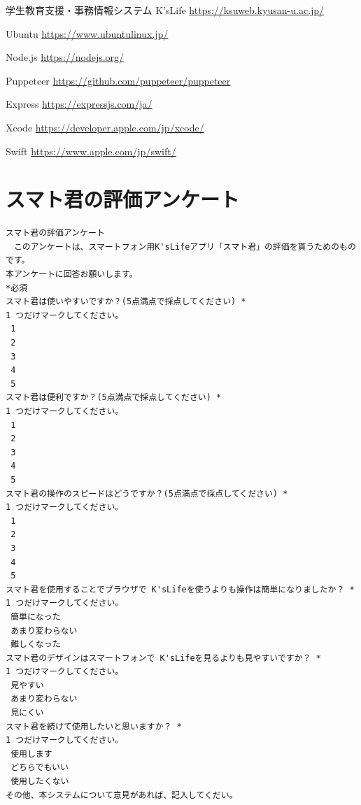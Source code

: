 \documentclass[a4j,12pt,onecolumn,oneside,titlepage,openany,final]{jreport}
\begin{document}
\begin{thebibliography}{99}%
学生教育支援・事務情報システム K'sLife \url{https://ksuweb.kyusan-u.ac.jp/}


   Ubuntu
  \url{https://www.ubuntulinux.jp/}

   Node.js
  \url{https://nodejs.org/}

   Puppeteer
  \url{https://github.com/puppeteer/puppeteer}

   Express
  \url{https://expressjs.com/ja/}

   Xcode
  \url{https://developer.apple.com/jp/xcode/}

   Swift
  \url{https://www.apple.com/jp/swift/}


\end{thebibliography}
\appendix
\chapter{スマト君の評価アンケート}\label{hyouka}
\begin{verbatim}
スマト君の評価アンケート
　このアンケートは、スマートフォン用K'sLifeアプリ「スマト君」の評価を貰うためのものです。
本アンケートに回答お願いします。
*必須
スマト君は使いやすいですか？(5点満点で採点してください) *
1 つだけマークしてください。
 1
 2
 3
 4
 5
スマト君は便利ですか？(5点満点で採点してください) *
1 つだけマークしてください。
 1
 2
 3
 4
 5
スマト君の操作のスピードはどうですか？(5点満点で採点してください) *
1 つだけマークしてください。
 1
 2
 3
 4
 5
スマト君を使用することでブラウザで K'sLifeを使うよりも操作は簡単になりましたか？ *
1 つだけマークしてください。
 簡単になった
 あまり変わらない
 難しくなった
スマト君のデザインはスマートフォンで K'sLifeを見るよりも見やすいですか？ *
1 つだけマークしてください。
 見やすい
 あまり変わらない
 見にくい
スマト君を続けて使用したいと思いますか？ *
1 つだけマークしてください。
 使用します
 どちらでもいい
 使用したくない
その他、本システムについて意見があれば、記入してくだい。

\end{verbatim}
\end{document}

